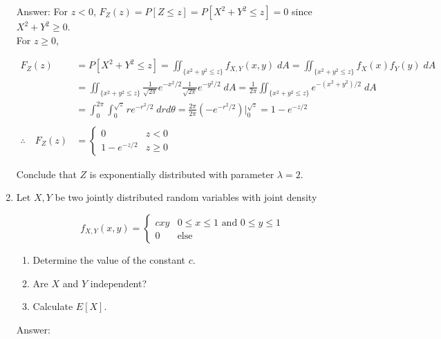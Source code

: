 \documentclass{article}
\begin{document}
\begin{enumerate}
Answer: For $z<0$, $F_Z(z) = P[Z \leq z] = P[X^2+Y^2 \leq z] = 0$ since $X^2 + Y^2 \geq 0$. \\

For $z \geq 0$,

\begin{align*}
F_Z(z) &= P[X^2 + Y^2 \leq z]
= \iint_{\{x^2+y^2 \leq z\}} f_{X,Y}(x,y) \; dA
= \iint_{\{x^2+y^2 \leq z\}} f_{X}(x)f_{Y}(y) \; dA \\
&= \iint_{\{x^2+y^2 \leq z\}} \frac{1}{\sqrt{2\pi}} e^{-x^2/2} \frac{1}{\sqrt{2\pi}} e^{-y^2/2}\; dA
= \frac{1}{2\pi} \iint_{\{x^2+y^2 \leq z\}} e^{-(x^2+y^2)/2} \; dA \\
&= \int_{0}^{2\pi} \int_{0}^{\sqrt{z}} re^{-r^2/2} \; drd\theta
= \frac{2\pi}{2\pi}\left(-e^{-r^2 / 2}\right)\biggr\vert_{0}^{\sqrt{z}}
= 1-e^{-z/2}\\
&\\
\therefore \quad F_Z(z) &=
\begin{cases}
0 & z < 0 \\
1-e^{-z/2} & z \geq 0
\end{cases}
\end{align*}

Conclude that $Z$ is exponentially distributed with parameter $\lambda = 2$. 

\newpage
\item

Let $X, Y$ be two jointly distributed random variables with joint density

$$
f_{X,Y}(x,y)=
\begin{cases}
cxy & 0 \leq x \leq 1 \text{ and } 0 \leq y \leq 1 \\
0 & \text{else}
\end{cases}
$$

\begin{enumerate}
\item
Determine the value of the constant $c$. 

\item
Are $X$ and $Y$ independent?

\item
Calculate $E[X]$.
\end{enumerate}

Answer: 


\end{enumerate}
\end{document}
